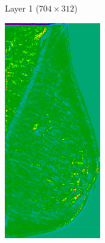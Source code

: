 \documentclass{beamer}
\begin{document}
\begin{frame}
\begin{figure}
\begin{subfigure}{0.19\textwidth}
		        \caption{Layer 1 ($704 \times 312$)}
            \end{subfigure}
	        \begin{subfigure}{0.19\textwidth}
		        \centering
			        \includegraphics[width=\textwidth]{plots/layer_4.png}

\end{subfigure}
\end{figure}
\end{frame}
\end{document}
